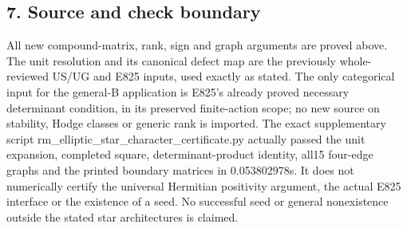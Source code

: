\subsection{7. Source and check
boundary}\label{SF-E832:source-and-check-boundary}

All new compound-matrix, rank, sign and graph arguments are proved
above. The unit resolution and its canonical defect map are the
previously whole-reviewed US/UG and E825 inputs, used exactly as stated.
The only categorical input for the general-B application is E825's
already proved necessary determinant condition, in its preserved
finite-action scope; no new source on stability, Hodge classes or
generic rank is imported. The exact supplementary script
rm\_elliptic\_star\_character\_certificate.py actually passed the unit
expansion, completed square, determinant-product identity, all15
four-edge graphs and the printed boundary matrices in 0.053802978s. It
does not numerically certify the universal Hermitian positivity
argument, the actual E825 interface or the existence of a seed. No
successful seed or general nonexistence outside the stated star
architectures is claimed.
